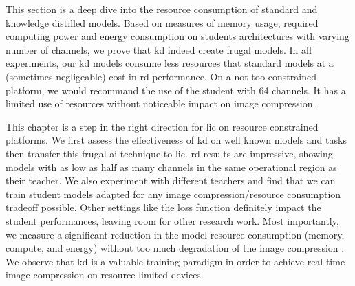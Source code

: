 This section is a deep dive into the resource consumption of standard and knowledge distilled models. Based on measures of memory usage, required computing power and energy consumption on students architectures with varying number of channels, we prove that \acrshort{kd} indeed create frugal models. In all experiments, our \acrshort{kd} models consume less resources that standard models at a (sometimes negligeable) cost in \acrshort{rd} performance. On a not-too-constrained platform, we would recommand the use of the student with 64 channels. It has a limited use of resources without noticeable impact on image compression.

This chapter is a step in the right direction for \acrshort{lic} on resource constrained platforms. We first assess the effectiveness of \acrshort{kd} on well known models and tasks then transfer this frugal \acrshort{ai} technique to \acrshort{lic}. \acrshort{rd} results are impressive, showing models with as low as half as many channels in the same operational region as their teacher. We also experiment with different teachers and find that we can train student models adapted for any image compression/resource consumption tradeoff possible. Other settings like the loss function definitely impact the student performances, leaving room for other research work. Most importantly, we measure a significant reduction in the model resource consumption (memory, compute, and energy) without too much degradation of the image compression . We observe that \acrshort{kd} is a valuable training paradigm in order to achieve real-time image compression on resource limited devices.